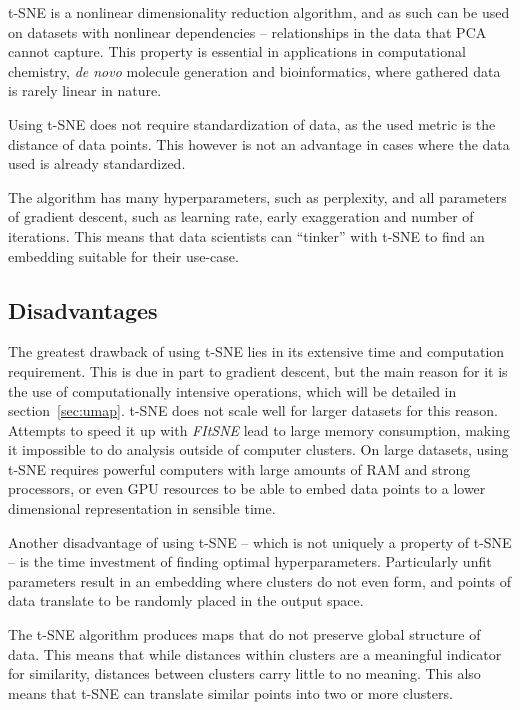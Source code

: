 t-SNE is a nonlinear dimensionality reduction algorithm, and as such can be used on datasets with nonlinear dependencies -- relationships in the data that PCA cannot capture. This property is essential in applications in computational chemistry, \textit{de novo} molecule generation and bioinformatics, where gathered data is rarely linear in nature.

Using t-SNE does not require standardization of data, as the used metric is the distance of data points. This however is not an advantage in cases where the data used is already standardized.

The algorithm has many hyperparameters, such as perplexity, and all parameters of gradient descent, such as learning rate, early exaggeration and number of iterations. This means that data scientists can ``tinker'' with t-SNE to find an embedding suitable for their use-case.

\subsection{Disadvantages}

The greatest drawback of using t-SNE lies in its extensive time and computation requirement. This is due in part to gradient descent, but the main reason for it is the use of computationally intensive operations, which will be detailed in section~\ref{sec:umap}. t-SNE does not scale well for larger datasets for this reason. Attempts to speed it up with \textit{FItSNE}\cite{bib:tsne:FItSNE} lead to large memory consumption, making it impossible to do analysis outside of computer clusters. On large datasets, using t-SNE requires powerful computers with large amounts of RAM and strong processors, or even GPU resources to be able to embed data points to a lower dimensional representation in sensible time.

Another disadvantage of using t-SNE -- which is not uniquely a property of t-SNE -- is the time investment of finding optimal hyperparameters. Particularly unfit parameters result in an embedding where clusters do not even form, and points of data translate to be randomly placed in the output space.\cite{bib:distill}

The t-SNE algorithm produces maps that do not preserve global structure of data. This means that while distances within clusters are a meaningful indicator for similarity, distances between clusters carry little to no meaning. This also means that t-SNE can translate similar points into two or more clusters.

